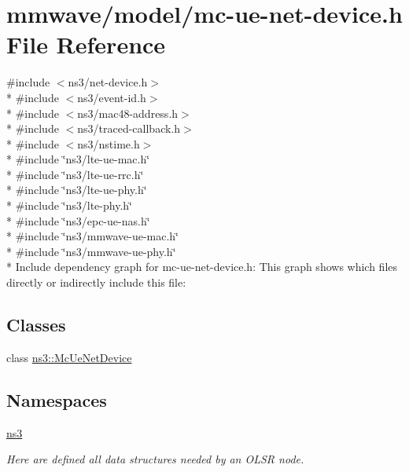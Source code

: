 \hypertarget{mc-ue-net-device_8h}{}\section{mmwave/model/mc-\/ue-\/net-\/device.h File Reference}
\label{mc-ue-net-device_8h}
{\ttfamily \#include $<$ns3/net-\/device.\+h$>$}\\*
{\ttfamily \#include $<$ns3/event-\/id.\+h$>$}\\*
{\ttfamily \#include $<$ns3/mac48-\/address.\+h$>$}\\*
{\ttfamily \#include $<$ns3/traced-\/callback.\+h$>$}\\*
{\ttfamily \#include $<$ns3/nstime.\+h$>$}\\*
{\ttfamily \#include \char`\"{}ns3/lte-\/ue-\/mac.\+h\char`\"{}}\\*
{\ttfamily \#include \char`\"{}ns3/lte-\/ue-\/rrc.\+h\char`\"{}}\\*
{\ttfamily \#include \char`\"{}ns3/lte-\/ue-\/phy.\+h\char`\"{}}\\*
{\ttfamily \#include \char`\"{}ns3/lte-\/phy.\+h\char`\"{}}\\*
{\ttfamily \#include \char`\"{}ns3/epc-\/ue-\/nas.\+h\char`\"{}}\\*
{\ttfamily \#include \char`\"{}ns3/mmwave-\/ue-\/mac.\+h\char`\"{}}\\*
{\ttfamily \#include \char`\"{}ns3/mmwave-\/ue-\/phy.\+h\char`\"{}}\\*
Include dependency graph for mc-\/ue-\/net-\/device.h\+:
This graph shows which files directly or indirectly include this file\+:
\subsection*{Classes}
\begin{DoxyCompactItemize}
\item 
class \hyperlink{classns3_1_1McUeNetDevice}{ns3\+::\+Mc\+Ue\+Net\+Device}
\end{DoxyCompactItemize}
\subsection*{Namespaces}
\begin{DoxyCompactItemize}
\item 
 \hyperlink{namespacens3}{ns3}
\begin{DoxyCompactList}\small\item\em Here are defined all data structures needed by an O\+L\+SR node. \end{DoxyCompactList}\end{DoxyCompactItemize}
